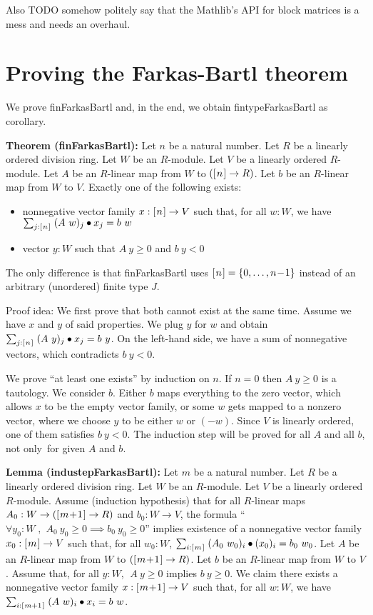 \documentclass[]{article}
\renewcommand{\.}{\hskip .75pt}
\newcommand{\fin}[1]{[\.#1\.]}
\DeclareMathOperator{\st}{,\;}
\let\r=\rightarrow
\begin{document}
Also TODO somehow politely say that the Mathlib's API for block matrices
is a mess and needs an overhaul.


\section {Proving the Farkas-Bartl theorem}

We prove finFarkasBartl and, in the end, we obtain fintypeFarkasBartl as corollary.

\medskip \noindent
\textbf{Theorem (finFarkasBartl):}
Let $n$ be a natural number.
Let $R$ be a linearly ordered division ring.
Let $W$ be an $R$-module.
Let $V$ be a linearly ordered $R$-module.
Let $A$ be an $R$-linear map from $W$ to $(\fin{n} \r R)$.
Let $b$ be an $R$-linear map from $W$ to $V$.
Exactly one of the following exists:
\begin{itemize}
\item nonnegative vector family $x : \fin{n} \r V$ such that, for all $w : W$, we have
$ \sum_{j : \fin{n}}\; (A~w)_j \bullet x_j = b~w $
\item vector $y : W$ such that $A~y \ge 0$ and $b~y < 0$
\end{itemize}
The only difference is that finFarkasBartl uses $\fin{n} = \{ 0, \dots, n\!-\!1 \}$
instead of an arbitrary (unordered) finite type $J$.

\medskip \noindent
Proof idea:
We first prove that both cannot exist at the same time.
Assume we have $x$ and $y$ of said properties.
We plug $y$ for $w$ and obtain
$ \sum_{j : \fin{n}}\; (A~y)_j \bullet x_j = b~y $.
On the left-hand side, we have a sum of nonnegative vectors,
which contradicts $b~y < 0$.
\smallskip

We prove ``at least one exists'' by induction on $n$.
If $n=0$ then $A~y \ge 0$ is a tautology.
We consider $b$. Either $b$ maps everything to the
zero vector, which allows $x$ to be the empty vector family,
or some $w$ gets mapped to a nonzero vector, where
we choose $y$ to be either $w$ or $(-w)$.
Since $V$ is linearly ordered, one of them satisfies $b~y<0$.
The induction step will be proved for all $A$ and all $b$,
not only~for given $A$ and $b$.

\medskip \noindent
\textbf{Lemma (industepFarkasBartl):}
Let $m$ be a natural number.
Let $R$ be a linearly ordered division ring.
Let $W$ be an $R$-module.
Let $V$ be a linearly ordered $R$-module.
Assume (induction hypothesis) that
for all $R$-linear maps $A_0 : W \r (\fin{m\!+\!1} \r R)$
and $b_0 : W \r V$, the formula
``$\forall y_0 : W \st A_0~y_0 \ge 0 \implies b_0~y_0 \ge 0$''
implies existence of a nonnegative vector family $x_0 : \fin{m} \r V$ such that,
for all $w_0 : W$, $ \sum_{i : \fin{m}}\; (A_0~w_0)_i \bullet (x_0)_i = b_0~w_0 $.
Let $A$ be an $R$-linear map from $W$ to $(\fin{m\!+\!1} \r R)$.
Let $b$ be an $R$-linear map from $W$ to $V$.
Assume that, for all $y : W$, $\;A~y \ge 0$ implies $b~y \ge 0$.
We claim there exists a nonnegative vector family $x : \fin{m\!+\!1} \r V$
such that, for all $w : W$, we have
$ \sum_{i : \fin{m+1}}\; (A~w)_i \bullet x_i = b~w $.
\end{document}
